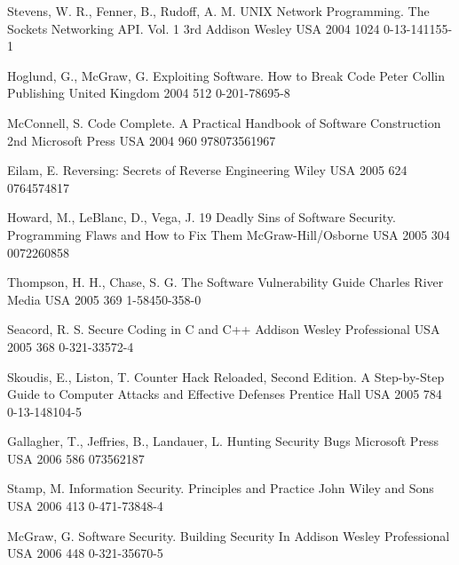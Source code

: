 \begin{thebibliography}{9}
		{Stevens, W. R., Fenner, B., Rudoff, A. M.} %
		{{UNIX} Network Programming. The Sockets Networking {API}. Vol. 1}
		{3rd}
		{Addison Wesley}
		{USA}
		{2004}
		{1024}
		{0-13-141155-1}
	
		{Hoglund, G., McGraw, G.} %
		{Exploiting Software. How to Break Code}
		{}
		{Peter Collin Publishing}
		{United Kingdom}
		{2004}
		{512}
		{0-201-78695-8}
	
		{McConnell, S.} %
		{Code Complete. A Practical Handbook of Software Construction}
		{2nd}
		{Microsoft Press}
		{USA}
		{2004}
		{960}
		{978073561967}
	
		{Eilam, E.} %
		{Reversing: Secrets of Reverse Engineering}
		{}
		{Wiley}
		{USA}
		{2005}
		{624}
		{0764574817}
	
		{Howard, M., LeBlanc, D., Vega, J.} %
		{19 Deadly Sins of Software Security. Programming Flaws and How to Fix Them}
		{}
		{McGraw-Hill/Osborne}
		{USA}
		{2005}
		{304}
		{0072260858}
	
		{Thompson, H. H., Chase, S. G.} %
		{The Software Vulnerability Guide}
		{}
		{Charles River Media}
		{USA}
		{2005}
		{369}
		{1-58450-358-0}
	
		{Seacord, R. S.} %
		{Secure Coding in {C} and {C++}}
		{}
		{Addison Wesley Professional}
		{USA}
		{2005}
		{368}
		{0-321-33572-4}
	
		{Skoudis, E., Liston, T.} %
		{Counter Hack Reloaded, Second Edition. A Step-by-Step Guide to Computer Attacks and Effective Defenses}
		{}
		{Prentice Hall}
		{USA}
		{2005}
		{784}
		{0-13-148104-5}
	
		{Gallagher, T., Jeffries, B., Landauer, L.} %
		{Hunting Security Bugs}
		{}
		{Microsoft Press}
		{USA}
		{2006}
		{586}
		{073562187}
	
		{Stamp, M.} %
		{Information Security. Principles and Practice}
		{}
		{John Wiley and Sons}
		{USA}
		{2006}
		{413}
		{0-471-73848-4}
	
		{McGraw, G.} %
		{Software Security. Building Security In}
		{}
		{Addison Wesley Professional}
		{USA}
		{2006}
		{448}
		{0-321-35670-5}
	

\end{thebibliography}

